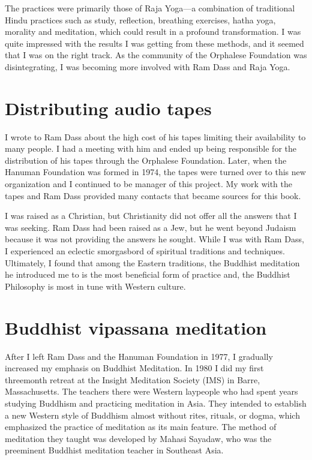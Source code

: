 \documentclass[a5paper,10pt,english]{book}
\begin{document}
\sphinxAtStartPar
The practices were primarily those of Raja Yoga—a combination of
traditional Hindu practices such as study, reflection, breathing
exercises, hatha yoga, morality and meditation, which could result in a
profound transformation. I was quite impressed with the results I was
getting from these methods, and it seemed that I was on the right track.
As the community of the Orphalese Foundation was disintegrating, I was
becoming more involved with Ram Dass and Raja Yoga.


\section{Distributing audio tapes}
\label{\detokenize{preface:distributing-audio-tapes}}
\sphinxAtStartPar
I wrote to Ram Dass about the high cost of his tapes limiting
their availability to many people. I had a meeting with him and ended up
being responsible for the distribution of his tapes through the
Orphalese Foundation. Later, when the Hanuman Foundation was formed in
1974, the tapes were turned over to this new organization and I
continued to be manager of this project. My work with the tapes and Ram
Dass provided many contacts that became sources for this book.

\sphinxAtStartPar
I was raised as a Christian, but Christianity did not offer all the
answers that I was seeking. Ram Dass had been raised as a Jew, but he
went beyond Judaism because it was not providing the answers he sought.
While I was with Ram Dass, I experienced an eclectic smorgasbord of
spiritual traditions and techniques. Ultimately, I found that among the
Eastern traditions, the Buddhist meditation he introduced me to is the
most beneficial form of practice and, the Buddhist Philosophy is most in
tune with Western culture.


\section{Buddhist vipassana meditation}
\label{\detokenize{preface:buddhist-vipassana-meditation}}
\sphinxAtStartPar
After I left Ram Dass and the Hanuman Foundation in 1977, I gradually
increased my emphasis on Buddhist  Meditation. In 1980 I
did my first three\sphinxhyphen{}month retreat at the Insight Meditation Society (IMS)
in Barre, Massachusetts. The teachers there were Western laypeople who
had spent years studying Buddhism and practicing meditation in Asia.
They intended to establish a new Western style of Buddhism almost
without rites, rituals, or dogma, which emphasized the practice of
meditation as its main feature. The method of meditation they taught was
developed by Mahasi Sayadaw, who was the preeminent Buddhist meditation
teacher in Southeast Asia.
\end{document}
